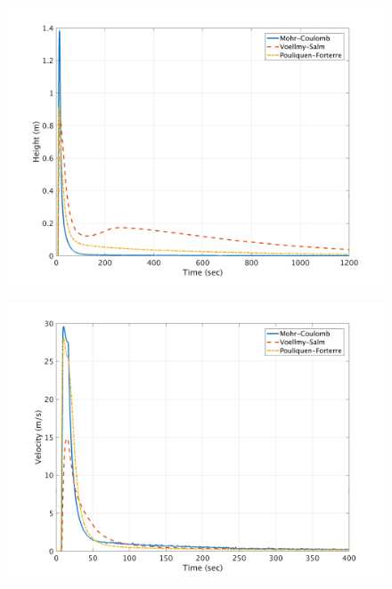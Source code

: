 \documentclass[a4paper,10pt]{article}
\begin{document}
\begin{figure}[H]
	\begin{minipage}[b]{0.5\linewidth}
	\centering
    \includegraphics[width=1\textwidth]{HeightMeans/H2All.png}     
        \label{fig:MFHR_L2}
	\end{minipage}
	\begin{minipage}[b]{0.5\linewidth}
	\centering
    \includegraphics[width=1\textwidth]{VelocityMeans/V2All.png}
        \label{fig:MFVR_L2}
	\end{minipage}
	

\end{figure}
\end{document}
